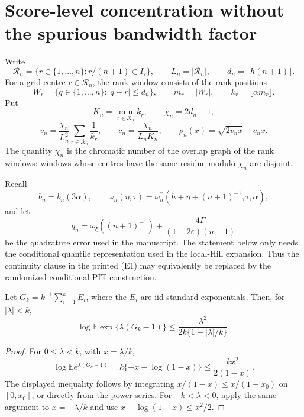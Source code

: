 
\section{Score-level concentration without the spurious bandwidth factor}
\label{sec:new-score-rate}

Write
\[
 \mathcal R_n=\{r\in\{1,\ldots,n\}:r/(n+1)\in I_\varepsilon\},
 \qquad L_n=|\mathcal R_n|,
 \qquad d_n=\lfloor h(n+1)\rfloor .
\]
For a grid centre $r\in\mathcal R_n$, the rank window consists of the rank
positions
\[
 W_r=\{q\in\{1,\ldots,n\}:|q-r|\le d_n\},
 \qquad m_r=|W_r|,
 \qquad k_r=\lfloor\alpha m_r\rfloor .
\]
Put
\[
 K_n=\min_{r\in\mathcal R_n}k_r,
 \qquad \chi_n=2d_n+1,
\]
\[
 v_n=\frac{\chi_n}{L_n^2}\sum_{r\in\mathcal R_n}\frac1{k_r},
 \qquad
 c_n=\frac{\chi_n}{L_nK_n},
 \qquad
 \rho_n(x)=\sqrt{2v_nx}+c_nx .
\]
The quantity $\chi_n$ is the chromatic number of the overlap graph of the
rank windows: windows whose centres have the same residue modulo $\chi_n$
are disjoint.

Recall
\[
 b_n=b_n(3\alpha),
 \qquad
 \omega_n(\eta,\tau)
 =\omega_n^{\uparrow}(h+\eta+(n+1)^{-1},\tau,\alpha),
\]
and let
\[
 q_n=\omega_\xi((n+1)^{-1})+
 \frac{4\Gamma}{(1-2\varepsilon)(n+1)}
\]
be the quadrature error used in the manuscript. The statement below only
needs the conditional quantile representation used in the local-Hill
expansion. Thus the continuity clause in the printed (E1) may equivalently
be replaced by the randomized conditional PIT construction.

\begin{lemma}
\label{lem:new-gamma-mgf}
Let $G_k=k^{-1}\sum_{i=1}^kE_i$, where the $E_i$ are iid standard
exponentials. Then, for $|\lambda|<k$,
\[
 \log\mathbb E\exp\{\lambda(G_k-1)\}
 \le \frac{\lambda^2}{2k\{1-|\lambda|/k\}}.
\]
\end{lemma}

\begin{proof}
For $0\le\lambda<k$, with $x=\lambda/k$,
\[
 \log\mathbb E e^{\lambda(G_k-1)}
 =k\{-x-\log(1-x)\}
 \le \frac{kx^2}{2(1-x)}.
\]
The displayed inequality follows by integrating
$x/(1-x)\le x/(1-x_0)$ on $[0,x_0]$, or directly from the power series.
For $-k<\lambda<0$, apply the same argument to
$x=-\lambda/k$ and use $x-\log(1+x)\le x^2/2$.
\end{proof}

